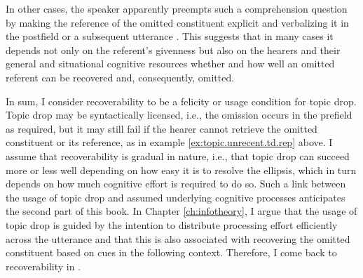 \largerpage
In other cases, the speaker apparently preempts such a comprehension question by making the reference of the omitted constituent explicit and verbalizing it in the postfield or a subsequent utterance \citep[191--192]{helmer2016}.
This suggests that in many cases it depends not only on the referent's givenness but also on the hearers and their general and situational cognitive resources  whether and how well an omitted referent can be recovered and, consequently, omitted.

In sum, I consider recoverability to be a felicity or usage condition for topic drop.
Topic drop may be syntactically licensed, i.e., the omission occurs in the prefield as required, but it may still fail if the hearer cannot retrieve the omitted constituent or its reference, as in example \ref{ex:topic.unrecent.td.rep} above.
I assume that recoverability is gradual in nature, i.e., that topic drop can succeed more or less well depending on how easy it is to resolve the ellipsis, which in turn depends on how much cognitive effort  is required to do so.
Such a link between the usage of topic drop and assumed underlying cognitive processes anticipates the second part of this book.
In Chapter \ref{ch:infotheory}, I argue that the usage of topic drop is guided by the intention to distribute processing effort  efficiently across the utterance and that this is also associated with recovering the omitted constituent based on cues in the following context.
Therefore, I come back to recoverability in .

